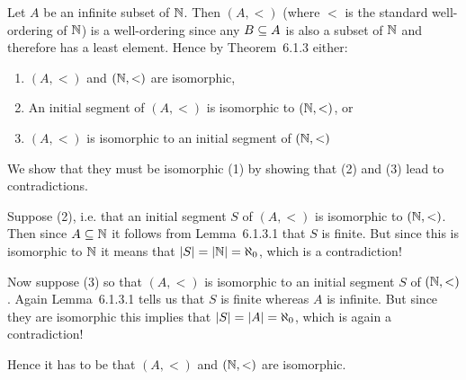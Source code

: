 \begin{solution}
	Let $A$ be an infinite subset of $\nats$.
    Then $(A, <)$ (where $<$ is the standard well-ordering of $\nats$) is a well-ordering since any $B \ss A$ is also a subset of $\nats$ and therefore has a least element.
    Hence by Theorem~6.1.3 either:
    \begin{enumerate}
        \item $(A,<)$ and $(\nats,<)$ are isomorphic, \\
        \item An initial segment of $(A,<)$ is isomorphic to $(\nats,<)$, or \\
        \item $(A,<)$ is isomorphic to an initial segment of $(\nats,<)$
    \end{enumerate}
    We show that they must be isomorphic (1) by showing that (2) and (3) lead to contradictions.

    Suppose (2), i.e. that an initial segment $S$ of $(A,<)$ is isomorphic to $(\nats,<)$.
    Then since $A \ss \nats$ it follows from Lemma~6.1.3.1 that $S$ is finite.
    But since this is isomorphic to $\nats$ it means that $|S| = |\nats| = \N$, which is a contradiction!

    Now suppose (3) so that $(A,<)$ is isomorphic to an initial segment $S$ of $(\nats, <)$.
    Again Lemma~6.1.3.1 tells us that $S$ is finite whereas $A$ is infinite.
    But since they are isomorphic this implies that $|S| = |A| = \N$, which is again a contradiction!

    Hence it has to be that $(A,<)$ and $(\nats,<)$ are isomorphic. \qedsymbol
\end{solution}


